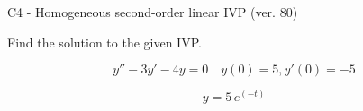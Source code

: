 \begin{exercise}
  \begin{exerciseTitle}C4 - Homogeneous second-order linear IVP (ver. 80)\end{exerciseTitle}
  \begin{exerciseStatement}
    
Find the solution to the given IVP.

    
\[y''-3y'-4y = 0 \hspace{1em} y(0) = 5 , y'(0) = -5\]

  \end{exerciseStatement}
  \begin{exerciseAnswer}
    
\[y= 5 \, e^{\left(-t\right)}\]

  \end{exerciseAnswer}
\end{exercise}